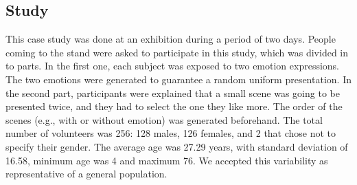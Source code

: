\subsection{Study}

This case study was done at an exhibition during a period of two days. People coming to the stand were asked to participate in this study, which was divided in to parts. In the first one, each subject was exposed to two emotion expressions. %
The two emotions were generated to guarantee a random uniform presentation. In the second part, participants were explained that a small scene was going to be presented twice, and they had to select the one they like more. The order of the scenes (e.g., with or without emotion) was generated beforehand. The total number of volunteers was 256: 128 males, 126 females, and 2 that chose not to specify their gender. The average age was 27.29 years, with standard deviation of 16.58, minimum age was 4 and maximum 76. We accepted this variability as representative of a general population.

